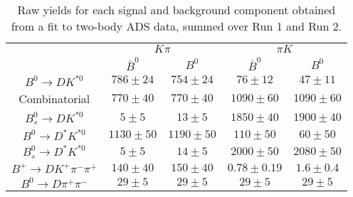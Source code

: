 \begin{table}
  \centering
  \begin{tabular}{ccccc}
      \toprule
       & \multicolumn{2}{c}{$K\pi$} & \multicolumn{2}{c}{$\pi K$} \\
      & $\bar{B}^0$ & $B^0$& $\bar{B}^0$ & $B^0$ \\
      \midrule
      $B^0 \to DK^{*0}$ & $786 \pm 24$ & $754 \pm 24$ & $76 \pm 12$ & $47 \pm 11$ \\
      Combinatorial & $770 \pm 40$ & $770 \pm 40$ & $1090 \pm 60$ & $1090 \pm 60$ \\
      $B^0_s \to DK^{*0}$ & $5 \pm 5$ & $13 \pm 5$ & $1850 \pm 40$ & $1900 \pm 40$ \\
      $B^0 \to D^*K^{*0}$ & $1130 \pm 50$ & $1190 \pm 50$ & $110 \pm 50$ & $60 \pm 50$ \\
      $B^0_s \to D^*K^{*0}$ & $5 \pm 5$ & $14 \pm 5$ & $2000 \pm 50$ & $2080 \pm 50$ \\
      $B^+ \to DK^+\pi^-\pi^+$ & $140 \pm 40$ & $150 \pm 40$ & $0.78 \pm 0.19$ & $1.6 \pm 0.4$ \\
      $B^0 \to D\pi^+\pi^-$ & $29 \pm 5$ & $29 \pm 5$ & $29 \pm 5$ & $29 \pm 5$ \\
      \bottomrule
      \end{tabular}
\caption{Raw yields for each signal and background component obtained from a fit to two-body ADS data, summed over Run 1 and Run 2.}
\label{tab:yields_split_2body_ADS}
\end{table}
